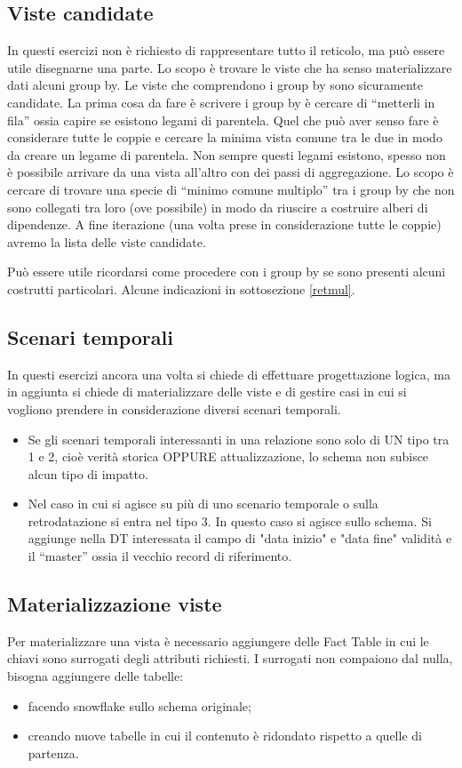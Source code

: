 \subsection{Viste candidate}
In questi esercizi non è richiesto di rappresentare tutto il reticolo, ma può essere utile disegnarne una parte.  Lo scopo è trovare le viste che ha senso materializzare dati alcuni group by. Le viste che comprendono i group by sono sicuramente candidate. La prima cosa da fare è scrivere i group by è cercare di “metterli in fila” ossia capire se esistono legami di parentela.\newline
Quel che può aver senso fare è considerare tutte le coppie e cercare la minima vista comune tra le due in modo da creare un legame di parentela. Non sempre questi legami esistono, spesso non è possibile arrivare da una vista all’altro con dei passi di aggregazione. Lo scopo è cercare di trovare una specie di “minimo comune multiplo” tra i group by che non sono collegati tra loro (ove possibile) in modo da riuscire a costruire alberi di dipendenze. A fine iterazione (una volta prese in considerazione tutte le coppie) avremo la lista delle viste candidate.
\begin{warn}
	Può essere utile ricordarsi come procedere con i group by se sono presenti alcuni costrutti particolari. Alcune indicazioni in sottosezione \ref{retmul}.
\end{warn}
\subsection{Scenari temporali}
In questi esercizi ancora una volta si chiede di effettuare progettazione logica, ma in aggiunta si chiede di materializzare delle viste e di gestire casi in cui si vogliono prendere in considerazione diversi scenari temporali.
\begin{itemize}
	\item Se gli scenari temporali interessanti in una relazione sono solo di UN tipo tra 1 e 2, cioè verità storica OPPURE attualizzazione, lo schema non subisce alcun tipo di impatto.
	\item Nel caso in cui si agisce su più di uno scenario temporale o sulla retrodatazione si entra nel tipo 3. In questo caso si agisce sullo schema. Si aggiunge nella DT interessata il campo di "data inizio" e "data fine" validità e il “master” ossia il vecchio record di riferimento.
\end{itemize}
\subsection{Materializzazione viste}
Per materializzare una vista è necessario aggiungere delle Fact Table in cui le chiavi sono surrogati degli attributi richiesti. I surrogati non compaiono dal nulla, bisogna aggiungere delle tabelle:
\begin{itemize}
	\item facendo snowflake sullo schema originale;
	\item creando nuove tabelle in cui il contenuto è ridondato rispetto a quelle di partenza.
\end{itemize}
